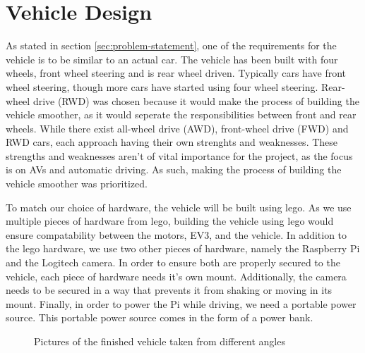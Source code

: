 \section{Vehicle Design}\label{sec:vehicle}%

As stated in section \autoref{sec:problem-statement}, one of the requirements for the vehicle is to be similar to an actual car.
The vehicle has been built with four wheels, front wheel steering and is rear wheel driven.
Typically cars have front wheel steering, though more cars have started using four wheel steering.
Rear-wheel drive (RWD) was chosen because it would make the process of building the vehicle smoother, as it would seperate the responsibilities between front and rear wheels.
While there exist all-wheel drive (AWD), front-wheel drive (FWD) and RWD cars, each approach having their own strenghts and weaknesses.
These strengths and weaknesses aren't of vital importance for the project, as the focus is on AVs and automatic driving.
As such, making the process of building the vehicle smoother was prioritized.
\cite{moog_car_steering_2019, collins_car_steering_2018,gareffa_car_drive_2019, glon_car_drive_2019}

To match our choice of hardware, the vehicle will be built using lego.
As we use multiple pieces of hardware from lego, building the vehicle using lego would ensure compatability between the motors, EV3, and the vehicle.
In addition to the lego hardware, we use two other pieces of hardware, namely the Raspberry Pi and the Logitech camera.
In order to ensure both are properly secured to the vehicle, each piece of hardware needs it's own mount.
Additionally, the camera needs to be secured in a way that prevents it from shaking or moving in its mount.
Finally, in order to power the Pi while driving, we need a portable power source.
This portable power source comes in the form of a power bank.

\begin{figure}[H]
    \centering
    \caption{Pictures of the finished vehicle taken from different angles}
    \label{fig:design-vehicleDesign-vehicleModel}
\end{figure}

